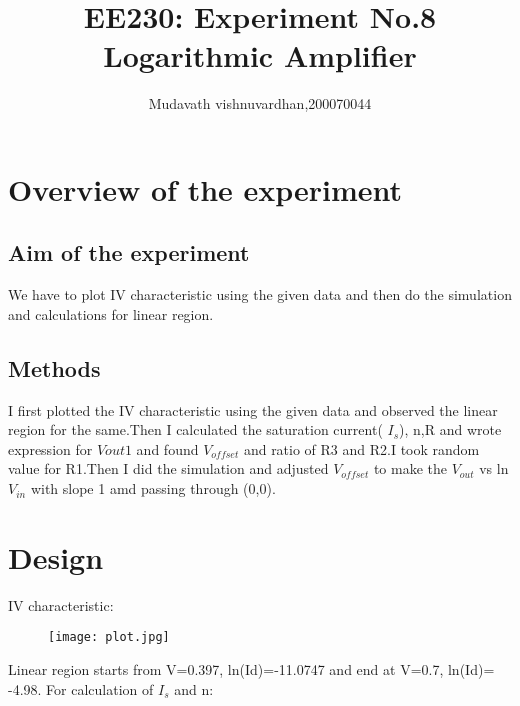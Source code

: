 \documentclass[12pt]{article}
\title{EE230: Experiment No.8\\
Logarithmic Amplifier}
\author{Mudavath vishnuvardhan,200070044}
\begin{document}
\maketitle


\section{Overview of the experiment} %

\subsection{Aim of the experiment}%

We have to plot IV characteristic using the given data and then do the simulation and calculations for linear region.

\subsection{Methods}




I first plotted the IV characteristic using the given data and observed the linear region for the same.Then I calculated the saturation current( \(I_{s}\)), n,R and wrote expression for \(V{out1}\) and found \(V_{offset}\) and ratio of R3 and R2.I took random value for R1.Then I did the simulation and adjusted \(V_{offset}\) to make the \(V_{out}\) vs ln\(V_{in}\) with slope 1 amd passing through (0,0).

\section{Design}%
IV characteristic:\newline
\begin{figure}

\centering
\texttt{[image: plot.jpg]}
\end{figure}
\newpage
Linear region starts from V=0.397, ln(Id)=-11.0747 and end at V=0.7, ln(Id)= -4.98.\newline
For calculation of \(I_{s}\) and n:\newline
 
\end{document}
